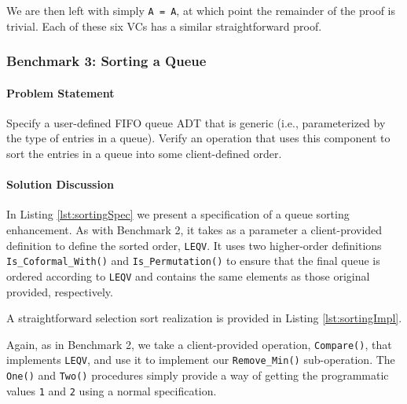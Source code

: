 We are then left with simply \texttt{A~=~A}, at which point the remainder of the proof is trivial.  Each of these six VCs has a similar straightforward proof.

\FloatBarrier
		\subsubsection{Benchmark 3: Sorting a Queue}	

\paragraph{Problem Statement}Specify a user-defined FIFO queue ADT that is generic (i.e., parameterized by the type of entries in a queue). Verify an operation that uses this component to sort the entries in a queue into some client-defined order.

\paragraph{Solution Discussion}In Listing \ref{lst:sortingSpec} we present a specification of a queue sorting enhancement.  As with Benchmark 2, it takes as a parameter a client-provided definition to define the sorted order, \texttt{LEQV}.  It uses two higher-order definitions \texttt{Is\_Coformal\_With()} and \texttt{Is\_Permutation()} to ensure that the final queue is ordered according to \texttt{LEQV} and contains the same elements as those original provided, respectively.



A straightforward selection sort realization is provided in Listing \ref{lst:sortingImpl}.



Again, as in Benchmark 2, we take a client-provided operation, \texttt{Compare()}, that implements \texttt{LEQV}, and use it to implement our \texttt{Remove\_Min()} sub-operation.  The \texttt{One()} and \texttt{Two()} procedures simply provide a way of getting the programmatic values \texttt{1} and \texttt{2} using a normal specification.


